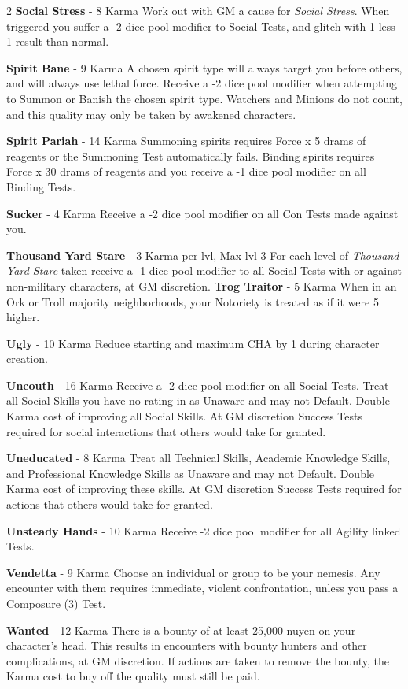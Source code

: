 \documentclass[
  oneside]{article}
\begin{document}
\begin{multicols}{2}
\textbf{Social Stress} - 8 Karma Work out with GM
a cause for \emph{Social Stress}. When triggered
you suffer a -2 dice pool modifier to Social
Tests, and glitch with 1 less 1 result than
normal.

\textbf{Spirit Bane} - 9 Karma A chosen spirit
type will always target you before others, and
will always use lethal force. Receive a -2 dice
pool modifier when attempting to Summon or Banish
the chosen spirit type. Watchers and Minions do
not count, and this quality may only be taken by
awakened characters.

\textbf{Spirit Pariah} - 14 Karma Summoning
spirits requires Force x 5 drams of reagents or
the Summoning Test automatically fails. Binding
spirits requires Force x 30 drams of reagents and
you receive a -1 dice pool modifier on all Binding
Tests.

\textbf{Sucker} - 4 Karma Receive a -2 dice pool
modifier on all Con Tests made against you.

\textbf{Thousand Yard Stare} - 3 Karma per lvl,
Max lvl 3 For each level of \emph{Thousand Yard
Stare} taken receive a -1 dice pool modifier to
all Social Tests with or against non-military
characters, at GM discretion. \textbf{Trog
Traitor} - 5 Karma When in an Ork or Troll
majority neighborhoods, your Notoriety is treated
as if it were 5 higher.

\textbf{Ugly} - 10 Karma Reduce starting and
maximum CHA by 1 during character creation.

\textbf{Uncouth} - 16 Karma Receive a -2 dice pool
modifier on all Social Tests. Treat all Social
Skills you have no rating in as Unaware and may
not Default. Double Karma cost of improving all
Social Skills. At GM discretion Success Tests
required for social interactions that others would
take for granted.

\textbf{Uneducated} - 8 Karma Treat all Technical
Skills, Academic Knowledge Skills, and
Professional Knowledge Skills as Unaware and may
not Default. Double Karma cost of improving these
skills. At GM discretion Success Tests required
for actions that others would take for granted.

\textbf{Unsteady Hands} - 10 Karma Receive -2 dice
pool modifier for all Agility linked Tests.

\textbf{Vendetta} - 9 Karma Choose an individual
or group to be your nemesis. Any encounter with
them requires immediate, violent confrontation,
unless you pass a Composure (3) Test.

\textbf{Wanted} - 12 Karma There is a bounty of at
least 25,000 nuyen on your character's head. This
results in encounters with bounty hunters and
other complications, at GM discretion. If actions
are taken to remove the bounty, the Karma cost to
buy off the quality must still be paid.


\end{multicols}
\end{document}
